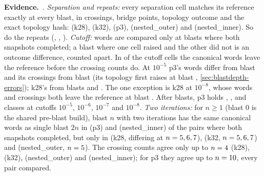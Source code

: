 \documentclass[11pt,a4paper]{article}
\newcommand{\evidence}{\par\smallskip\noindent\textbf{Evidence.}~}
\begin{document}
\evidence {}.
\emph{Separation and repeats:} every separation cell matches its reference
exactly at every blast, in crossings, bridge points, topology outcome and
the exact topology hash: \NumDeepSeparationIdenticalKTwoEight{} (k28),
\NumDeepSeparationIdenticalKThreeTwo{} (k32),
\NumDeepSeparationIdenticalPThree{} (p3),
\NumDeepSeparationIdenticalNestedOuter{} (nested\_outer) and
\NumDeepSeparationIdenticalNestedInner{} (nested\_inner). So do the repeats
(\NumDeepRepeatIdenticalKTwoEight, \NumDeepRepeatIdenticalPThree,
\NumDeepRepeatIdenticalNestedInner).
\emph{Cutoff:} words are compared only at blasts where both snapshots
completed; a blast where one cell raised and the other did not is an
outcome difference, counted apart. In \NumDeepCutoffWordsFirst{} of the
\NumDeepCutoffCells{} cutoff cells the canonical words leave the reference
before the crossing counts do. At $10^{-5}$ p3's words differ from blast
\NumDeepCutoffFiveWordsPThree{} and its crossings from blast
\NumDeepCutoffFiveCrossingsPThree{} (its topology first raises at blast
\NumDeepCutoffFiveOutcomePThree, \cref{sec:blastdepth-errors}); k28's from
blasts \NumDeepCutoffFiveWordsKTwoEight{} and
\NumDeepCutoffFiveCrossingsKTwoEight. The one exception is k28 at
$10^{-8}$, whose words and crossings both leave the reference at blast
\NumDeepCutoffEightWordsKTwoEight. After
\NumDeepBlastsPThree{} blasts, p3 holds \NumDeepCutoffFiveClassesPThree,
\NumDeepCutoffSixClassesPThree, \NumDeepClassesEndPThree{} and
\NumDeepCutoffEightClassesPThree{} classes at cutoffs $10^{-5}$, $10^{-6}$,
$10^{-7}$ and $10^{-8}$.
\emph{Two iterations:} for $n\ge1$ (blast 0 is the shared pre-blast build),
blast $n$ with two iterations has the same canonical
words as single blast $2n$ in \NumDeepDoubleWordsSamePThree{} (p3) and
\NumDeepDoubleWordsSameNestedInner{} (nested\_inner) of the pairs where both
snapshots completed, but only in \NumDeepDoubleWordsSameKTwoEight{} (k28,
differing at $n=5, 6, 7$),
\NumDeepDoubleWordsSameKThreeTwo{} (k32, $n=5, 6, 7$)
and \NumDeepDoubleWordsSameNestedOuter{} (nested\_outer,
$n=5$). The crossing counts agree only up to
$n=4$ (k28),
\NumDeepDoubleCrossingsAgreeKThreeTwo{} (k32),
\NumDeepDoubleCrossingsAgreeNestedOuter{} (nested\_outer) and
\NumDeepDoubleCrossingsAgreeNestedInner{} (nested\_inner); for p3 they agree
up to $n=10$, every pair compared.
\end{document}
